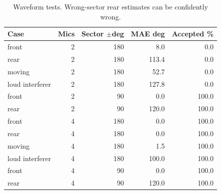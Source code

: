 \begin{table}[htbp]\centering\small
\caption{Waveform tests. Wrong-sector rear estimates can be confidently wrong.}
\begin{tabular}{lrrrr}\toprule
Case & Mics & Sector $\pm$deg & MAE deg & Accepted \% \\
\midrule
front & 2 & 180 & 8.0 & 0.0 \\
rear & 2 & 180 & 113.4 & 0.0 \\
moving & 2 & 180 & 52.7 & 0.0 \\
loud interferer & 2 & 180 & 127.8 & 0.0 \\
front & 2 & 90 & 0.0 & 100.0 \\
rear & 2 & 90 & 120.0 & 100.0 \\
front & 4 & 180 & 0.0 & 100.0 \\
rear & 4 & 180 & 0.0 & 100.0 \\
moving & 4 & 180 & 1.5 & 100.0 \\
loud interferer & 4 & 180 & 100.0 & 100.0 \\
front & 4 & 90 & 0.0 & 100.0 \\
rear & 4 & 90 & 120.0 & 100.0 \\
\bottomrule\end{tabular}\end{table}
